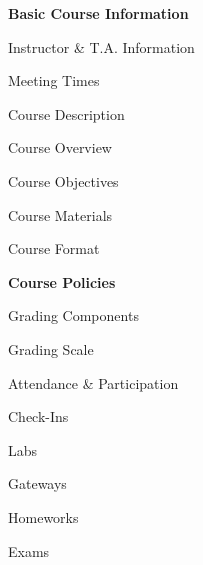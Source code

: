 \documentclass[11pt,letterpaper]{article}
\begin{document}
\mytitle


\begin{minipage}[t]{0.45\textwidth} %
{\bfseries\color{scred} Basic Course Information} \dotfill \pageref{course_info} \par
\hspace{0.3cm} Instructor \& T.A. Information \dotfill \pageref{instr_info} \par
\hspace{0.3cm} Meeting Times \dotfill \pageref{meetings} \par
\hspace{0.3cm} Course Description \dotfill \pageref{course_desc} \par
\hspace{0.3cm} Course Overview \dotfill \pageref{course_overview} \par
\hspace{0.3cm} Course Objectives \dotfill \pageref{course_obj} \par
\hspace{0.3cm} Course Materials \dotfill \pageref{course_mat} \par
\hspace{0.3cm} Course Format \dotfill \pageref{course_format} \par
{\bfseries\color{scred} Course Policies} \dotfill \pageref{course_policies} \par
\hspace{0.3cm} Grading Components \dotfill \pageref{grade_comp} \par
\hspace{0.3cm} Grading Scale \dotfill \pageref{grade_scale} \par
\hspace{0.3cm} Attendance \& Participation \dotfill \pageref{attend} \par
\hspace{0.3cm} Check-Ins \dotfill \pageref{check} \par
\hspace{0.3cm} Labs \dotfill \pageref{labs} \par
\hspace{0.3cm} Gateways \dotfill \pageref{gateways} \par
\hspace{0.3cm} Homeworks \dotfill \pageref{hw} \par
\hspace{0.3cm} Exams \dotfill \pageref{exams} \par

\end{minipage}
\end{document}
